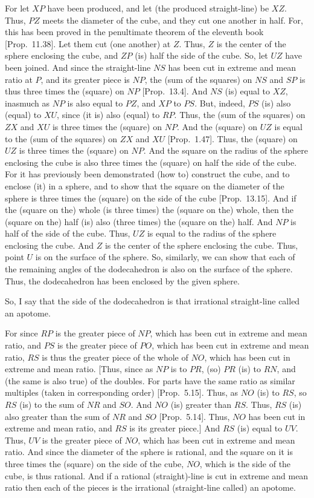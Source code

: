 For let $XP$ have been produced, and let (the produced straight-line) be $XZ$. Thus, $PZ$ meets
the diameter of the cube, and they cut one another in half.
For, this has been proved in the penultimate theorem of the eleventh book [Prop.~11.38]. Let them cut (one another) at $Z$. Thus, $Z$ is the
center of the sphere enclosing the cube, and $ZP$ (is) half the side of
the cube. So, let $UZ$ have been joined. And since the straight-line 
$NS$ has been cut in extreme and mean ratio at $P$, and its greater piece
is $NP$, the (sum of the squares) on $NS$ and $SP$
is thus three times the (square) on $NP$ [Prop.~13.4]. And $NS$ (is)
equal to $XZ$, inasmuch as $NP$ is also equal to $PZ$, and
$XP$ to $PS$. But, indeed, $PS$ (is) also (equal) to $XU$,
since (it is) also (equal) to $RP$. Thus, the (sum of the squares) on 
$ZX$ and $XU$ is three times the (square) on $NP$.
And  the (square)
on $UZ$ is equal to the (sum of the squares) on $ZX$ and $XU$ [Prop.~1.47].  Thus, the (square) on $UZ$ is three times the
(square) on $NP$. 
 And the square on the
radius of the sphere enclosing the cube is also three times the (square) on half
the side of the cube. For it has previously been demonstrated (how to) construct 
the cube, and to enclose (it) in a sphere, and to show that the square on
the diameter of the sphere is three times the (square) on the
side of the cube [Prop.~13.15]. And if the (square on the) whole (is three
times) the (square on the) whole, then the (square on the) half (is) also (three times) the (square on the) half. 
And $NP$ is half of the side of the cube. Thus, $UZ$ is equal to
the radius of the sphere enclosing the cube. And $Z$ is the center of the
sphere enclosing the cube.
Thus, point $U$
is on the surface of the sphere. So, similarly, we can show that each of
the remaining angles of the dodecahedron is also  on the surface of the sphere. 
Thus, the dodecahedron has been enclosed by the given sphere.

So, I say that the side of the dodecahedron is that irrational straight-line
called an apotome.

For since  $RP$ is the greater piece of $NP$, which has been cut in extreme and mean ratio, and $PS$ is the greater piece of $PO$, which
has been cut in extreme and mean ratio,  $RS$ is thus the greater piece of the
whole of $NO$, which has been cut in extreme and mean ratio.
[Thus, since as $NP$ is to $PR$, (so) $PR$ (is) to $RN$, and  (the same is also true) of the doubles.
For parts have the same ratio as similar multiples (taken in corresponding
order) [Prop.~5.15]. Thus, as $NO$ (is) to $RS$, so $RS$
(is) to the sum of $NR$ and $SO$. And $NO$
(is) greater than $RS$. Thus, $RS$ (is) also
greater than the sum of $NR$ and $SO$ [Prop.~5.14]. Thus, $NO$
has been cut in extreme and mean ratio, and  $RS$ is its greater piece.]
And $RS$ (is) equal to $UV$. Thus, $UV$ is the greater piece of
$NO$, which has been cut in extreme and mean ratio. 
And since the diameter of the sphere is rational, and the square on it
is three times the (square) on the side of the cube,  $NO$, which is
the side of the cube, is thus rational. And if a rational (straight)-line
is cut in extreme and mean ratio then each of the
pieces is the irrational (straight-line called) an apotome.

